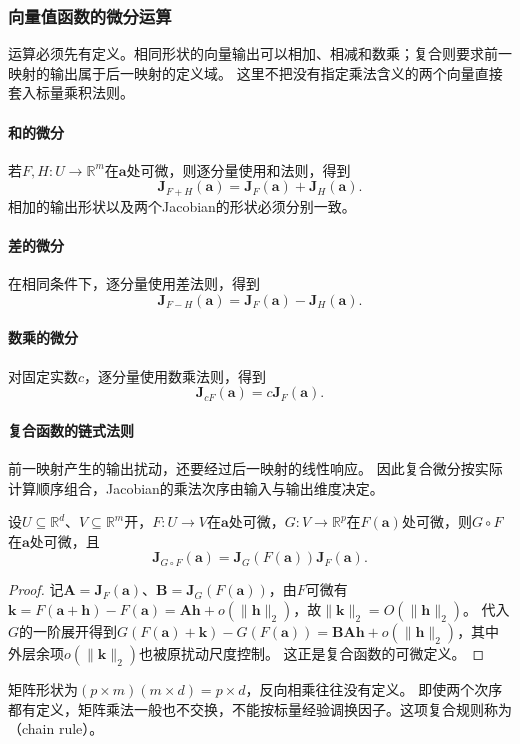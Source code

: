 \subsubsection{向量值函数的微分运算}
\label{sec:analysis-vector-chain-matrix-calculus}

运算必须先有定义。相同形状的向量输出可以相加、相减和数乘；复合则要求前一映射的输出属于后一映射的定义域。
这里不把没有指定乘法含义的两个向量直接套入标量乘积法则。

\paragraph{和的微分}
若$F,H:U\to\mathbb R^m$在$\bm a$处可微，则逐分量使用和法则，得到
\[
 \bm J_{F+H}(\bm a)=\bm J_F(\bm a)+\bm J_H(\bm a).
\]
相加的输出形状以及两个Jacobian的形状必须分别一致。

\paragraph{差的微分}
在相同条件下，逐分量使用差法则，得到
\[
 \bm J_{F-H}(\bm a)=\bm J_F(\bm a)-\bm J_H(\bm a).
\]

\paragraph{数乘的微分}
对固定实数$c$，逐分量使用数乘法则，得到
\[
 \bm J_{cF}(\bm a)=c\bm J_F(\bm a).
\]

\paragraph{复合函数的链式法则}
前一映射产生的输出扰动，还要经过后一映射的线性响应。
因此复合微分按实际计算顺序组合，Jacobian的乘法次序由输入与输出维度决定。
\begin{theorem}[向量值函数的链式法则]
\label{thm:multivariable-vector-chain-rule}
设$U\subseteq\mathbb R^d$、$V\subseteq\mathbb R^m$开，$F:U\to V$在$\bm a$处可微，$G:V\to\mathbb R^p$在$F(\bm a)$处可微，则$G\circ F$在$\bm a$处可微，且
\begin{equation}
 \bm J_{G\circ F}(\bm a)=\bm J_G(F(\bm a))\bm J_F(\bm a).
\label{eq:analysis-vector-chain-rule}
\end{equation}
\end{theorem}
\begin{proof}
记$\bm A=\bm J_F(\bm a)$、$\bm B=\bm J_G(F(\bm a))$，由$F$可微有$\bm k=F(\bm a+\bm h)-F(\bm a)=\bm A\bm h+o(\lVert\bm h\rVert_2)$，故$\lVert\bm k\rVert_2=O(\lVert\bm h\rVert_2)$。
代入$G$的一阶展开得到$G(F(\bm a)+\bm k)-G(F(\bm a))=\bm B\bm A\bm h+o(\lVert\bm h\rVert_2)$，其中外层余项$o(\lVert\bm k\rVert_2)$也被原扰动尺度控制。
这正是复合函数的可微定义。
\end{proof}
矩阵形状为$(p\times m)(m\times d)=p\times d$，反向相乘往往没有定义。
即使两个次序都有定义，矩阵乘法一般也不交换，不能按标量经验调换因子。这项复合规则称为（chain rule）。

